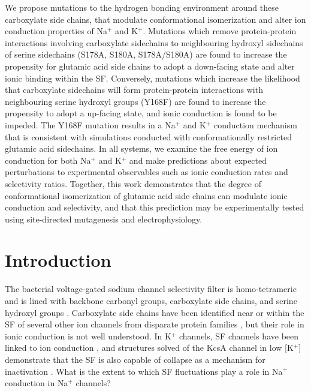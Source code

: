 \begin{refsection}
	We propose mutations to the hydrogen bonding environment around these carboxylate side chains, that modulate conformational isomerization and alter ion conduction properties of Na$^+$ and K$^+$. Mutations which remove protein-protein interactions involving carboxylate sidechains to neighbouring hydroxyl sidechains of serine sidechains (S178A, S180A, S178A/S180A) are found to increase the propensity for glutamic acid side chains to adopt a down-facing state and alter ionic binding within the SF. Conversely, mutations which increase the likelihood that carboxylate sidechains will form protein-protein interactions with neighbouring serine hydroxyl groups (Y168F) are found to increase the propensity to adopt a up-facing state, and ionic conduction is found to be impeded. The Y168F mutation results in a Na$^+$ and K$^+$ conduction mechanism that is consistent with simulations conducted with conformationally restricted glutamic acid sidechains. In all systems, we examine the free energy of ion conduction for both Na$^+$ and K$^+$ and make predictions about expected perturbations to experimental observables such as ionic conduction rates and selectivity ratios. Together, this work demonstrates that the degree of conformational isomerization of glutamic acid side chains can modulate ionic conduction and selectivity, and that this prediction may be experimentally tested using site-directed mutagenesis and electrophysiology.
	
\section{Introduction}


The bacterial voltage-gated sodium channel selectivity filter is homo-tetrameric and is lined with backbone carbonyl groups, carboxylate side chains, and serine hydroxyl groups \cite{Payandeh:2012ib}. Carboxylate side chains have been identified near or within the SF of several other ion channels from disparate protein families \cite{Li:2017ex,Paulsen:2015bp,Grieben:2016ij}, but their role in ionic conduction is not well understood.  In K$^+$ channels, SF channels have been linked to ion conduction \cite{Kratochvil:2016jx,Noskov:2004tv}, and structures solved of the KcsA channel in low [K$^+$] demonstrate that the SF is also capable of collapse as a mechanism for inactivation \cite{Zhou:2001vo}. What is the extent to which SF fluctuations play a role in Na$^+$ conduction in Na$^+$ channels?


\end{refsection}
